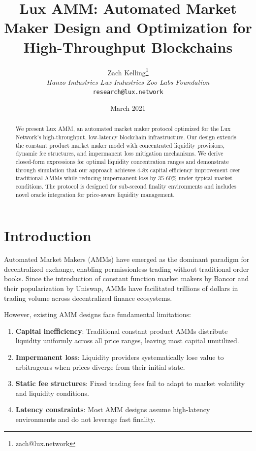 \documentclass[11pt,a4paper]{article}
\title{Lux AMM: Automated Market Maker Design and Optimization for High-Throughput Blockchains}
\author{Zach Kelling\thanks{zach@lux.network} \\ \textit{Hanzo Industries \quad Lux Industries \quad Zoo Labs Foundation} \\ \texttt{research@lux.network}}
\date{March 2021}
\begin{document}
\maketitle

\begin{abstract}
We present Lux AMM, an automated market maker protocol optimized for the Lux Network's high-throughput, low-latency blockchain infrastructure. Our design extends the constant product market maker model with concentrated liquidity provisions, dynamic fee structures, and impermanent loss mitigation mechanisms. We derive closed-form expressions for optimal liquidity concentration ranges and demonstrate through simulation that our approach achieves 4-8x capital efficiency improvement over traditional AMMs while reducing impermanent loss by 35-60\% under typical market conditions. The protocol is designed for sub-second finality environments and includes novel oracle integration for price-aware liquidity management.
\end{abstract}

\section{Introduction}

Automated Market Makers (AMMs) have emerged as the dominant paradigm for decentralized exchange, enabling permissionless trading without traditional order books. Since the introduction of constant function market makers by Bancor and their popularization by Uniswap, AMMs have facilitated trillions of dollars in trading volume across decentralized finance ecosystems.

However, existing AMM designs face fundamental limitations:
\begin{enumerate}
    \item \textbf{Capital inefficiency}: Traditional constant product AMMs distribute liquidity uniformly across all price ranges, leaving most capital unutilized.
    \item \textbf{Impermanent loss}: Liquidity providers systematically lose value to arbitrageurs when prices diverge from their initial state.
    \item \textbf{Static fee structures}: Fixed trading fees fail to adapt to market volatility and liquidity conditions.
    \item \textbf{Latency constraints}: Most AMM designs assume high-latency environments and do not leverage fast finality.
\end{enumerate}
\end{document}
